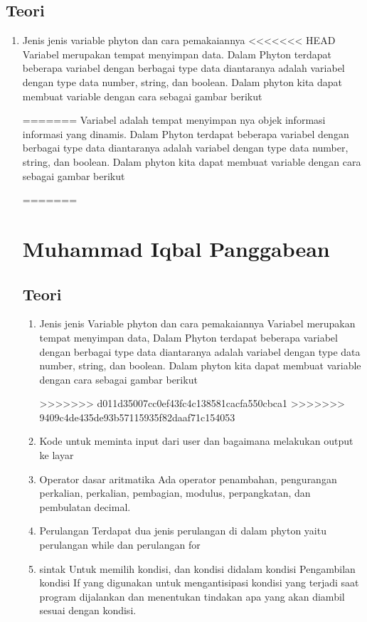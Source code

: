 \subsection{Teori}
\begin{enumerate}
    \item Jenis jenis variable phyton dan cara pemakaiannya
<<<<<<< HEAD
Variabel merupakan tempat menyimpan data. Dalam Phyton terdapat beberapa variabel dengan berbagai type data diantaranya adalah variabel dengan type data number, string, dan boolean. Dalam phyton kita dapat membuat variable dengan cara sebagai gambar berikut
   
=======
Variabel adalah tempat menyimpan nya objek informasi informasi yang dinamis. Dalam Phyton terdapat beberapa variabel dengan berbagai type data diantaranya adalah variabel dengan type data number, string, dan boolean. Dalam phyton kita dapat membuat variable dengan cara sebagai gambar berikut
   
=======
\section{Muhammad Iqbal Panggabean}
\subsection{Teori}
\begin{enumerate}
    \item Jenis jenis Variable phyton dan cara pemakaiannya 
Variabel merupakan tempat menyimpan data, Dalam Phyton terdapat beberapa variabel dengan berbagai type data diantaranya adalah variabel dengan type data number, string, dan boolean. Dalam phyton kita dapat membuat variable dengan cara sebagai gambar berikut
   
>>>>>>> d011d35007cc0ef43fc4c138581cacfa550cbca1
>>>>>>> 9409c4de435de93b57115935f82daaf71c154053
    \item Kode untuk meminta input dari user dan bagaimana melakukan output ke layar
 
    \item Operator dasar aritmatika
Ada operator penambahan, pengurangan perkalian, perkalian, pembagian, modulus, perpangkatan, dan pembulatan decimal.

    \item Perulangan
Terdapat dua jenis perulangan di dalam phyton yaitu perulangan while dan perulangan for
 
 
    \item sintak Untuk memilih kondisi, dan kondisi didalam kondisi
Pengambilan kondisi If yang digunakan untuk mengantisipasi kondisi yang terjadi saat program dijalankan dan menentukan tindakan apa yang akan diambil sesuai dengan kondisi.
  
  
  


\end{enumerate}
\end{enumerate}
